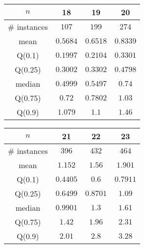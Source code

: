\begin{tabular}{c|ccc} 
\hline 
$n$ & 18 & 19 & 20 \tabularnewline 
\hline 
\hline 
\# instances & $107$ & $199$ & $274$ \tabularnewline 
mean & $0.5684$ & $0.6518$ & $0.8339$ \tabularnewline 
Q(0.1) & $0.1997$ & $0.2104$ & $0.3301$ \tabularnewline 
Q(0.25) & $0.3002$ & $0.3302$ & $0.4798$ \tabularnewline 
median & $0.4999$ & $0.5497$ & $0.74$ \tabularnewline 
Q(0.75) & $0.72$ & $0.7802$ & $1.03$ \tabularnewline 
Q(0.9) & $1.079$ & $1.1$ & $1.46$ \tabularnewline 
\hline 
\end{tabular} 
\medskip{} 

\begin{tabular}{c|ccc} 
\hline 
$n$ & 21 & 22 & 23 \tabularnewline 
\hline 
\hline 
\# instances & $396$ & $432$ & $464$ \tabularnewline 
mean & $1.152$ & $1.56$ & $1.901$ \tabularnewline 
Q(0.1) & $0.4405$ & $0.6$ & $0.7911$ \tabularnewline 
Q(0.25) & $0.6499$ & $0.8701$ & $1.09$ \tabularnewline 
median & $0.9901$ & $1.3$ & $1.61$ \tabularnewline 
Q(0.75) & $1.42$ & $1.96$ & $2.31$ \tabularnewline 
Q(0.9) & $2.01$ & $2.8$ & $3.28$ \tabularnewline 
\hline 
\end{tabular} 
\medskip{} 

